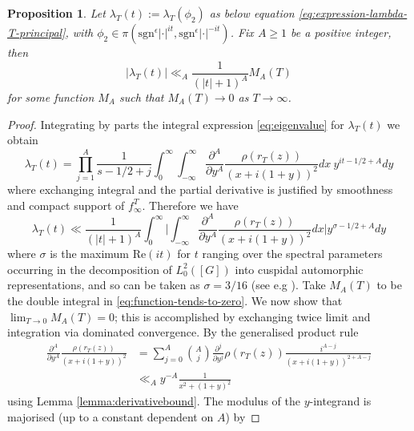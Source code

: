 \documentclass{article}
\newtheorem{proposition}[theorem]{Proposition}
\numberwithin{equation}{section}
\begin{document}
\begin{proposition} \label{prop:polydecay}
    Let $\lambda_T(t):=\lambda_T(\phi_2)$ as below equation \eqref{eq:expression-lambda-T-principal}, with $\phi_2 \in \pi(\text{sgn}^\epsilon |\cdot|^{it},\text{sgn}^\epsilon|\cdot|^{-it})$. Fix $A\geq1$ be a positive integer, then
    \begin{equation}|\lambda_{T}(t)|\ll_A\frac{1}{(|t|+1)^A}M_A(T)
    \end{equation}
    for some function $M_A$ such that $M_A(T)\to 0$ as $T\to \infty$.
\end{proposition}
\begin{proof}
    Integrating by parts the integral expression \eqref{eq:eigenvalue} for $\lambda_{T}(t)$ we obtain
    $$\lambda_{T}(t)=\prod_{j=1}^{A}\frac{1}{s-1/2+j}\int_{0}^{\infty}\int_{-\infty}^{\infty}\frac{\partial^A}{\partial y^A}\frac{\rho(r_T(z))}{(x+i(1+y))^2}dx \ y^{it-1/2+A}dy$$
    where exchanging integral and the partial derivative is justified by smoothness and compact support of $f_\infty^T$.
    Therefore we have
    \begin{equation} \label{eq:function-tends-to-zero}
    \lambda_{T}(t)\ll\frac{1}{(|t|+1)^A}\int_{0}^{\infty}\Bigr|\int_{-\infty}^{\infty}\frac{\partial ^A}{\partial y^A}\frac{\rho(r_T(z))}{(x+i(1+y))^2}dx\Bigr|y^{\sigma-1/2+A}dy
    \end{equation}
    where $\sigma$ is the maximum $\text{Re}(it)$ for $t$ ranging over the spectral parameters occurring in the decomposition of $L_0^2([G])$ into cuspidal automorphic representations, and so can be taken as $\sigma=3/16$ (see e.g \cite[Theorem 4]{Deshouillers}). Take $M_A(T)$ to be the double integral in \eqref{eq:function-tends-to-zero}. We now show that $\lim_{T\to 0}M_A(T)=0$; this is accomplished by exchanging twice limit and integration via dominated convergence. By the generalised product rule
    \begin{equation}\label{eq:derivative-bound}
        \begin{split}
            \frac{\partial^A}{\partial y^A}\frac{\rho(r_T(z))}{(x+i(1+y))^2} & =\sum_{j=0}^{A}\binom{A}{j}\frac{\partial ^j}{\partial y^j}\rho(r_T(z))\frac{i^{A-j}}{(x+i(1+y))^{2+A-j}}\\
            & \ll_A y^{-A}\frac{1}{x^2+(1+y)^2}      
        \end{split}
    \end{equation}
    using Lemma \ref{lemma:derivativebound}. The modulus of the $y$-integrand is majorised (up to a constant dependent on $A$) by 

\end{proof}
\end{document}
